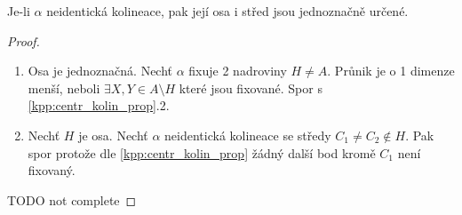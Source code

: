 \begin{consequence}
    Je-li $\alpha$ neidentická kolineace, pak její osa i střed jsou jednoznačně určené.
\end{consequence}
\begin{proof}~
	\begin{enumerate}
		\item Osa je jednoznačná.
			Nechť $\alpha$ fixuje 2 nadroviny $H \ne A$.
			Průnik je o 1 dimenze menší, neboli $\exists X, Y \in A \setminus H$ které jsou fixované.
			Spor s \cref{kpp:centr_kolin_prop}.2.
		\item Nechť $H$ je osa.
			Nechť $\alpha$ neidentická kolineace se středy $C_1 \ne C_2 \notin H$.
			Pak spor protože dle \cref{kpp:centr_kolin_prop} žádný další bod kromě $C_1$ není fixovaný.
	\end{enumerate}
    TODO not complete
\end{proof}


